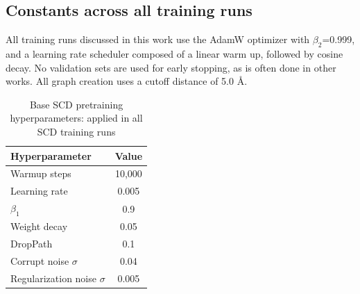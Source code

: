 




\subsection{Constants across all training runs}

All training runs discussed in this work use the AdamW optimizer with $\beta_2$=0.999, and a learning rate scheduler composed of a linear warm up, followed by cosine decay. No validation sets are used for early stopping, as is often done in other works. All graph creation uses a cutoff distance of 5.0 \AA.


\begin{table}[t]
\centering
\caption{Base SCD pretraining hyperparameters: applied in all SCD training runs }
\label{tab:pretrain_hparams}
\begin{tabular}{lc}
\toprule
\textbf{Hyperparameter} & \textbf{Value} \\
\midrule
Warmup steps        & 10{,}000 \\
Learning rate       & 0.005 \\
$\beta_1$           & 0.9 \\
Weight decay        & 0.05 \\
DropPath            & 0.1 \\
Corrupt noise $\sigma$ & 0.04 \\
Regularization noise $\sigma$ & 0.005 \\
\bottomrule
\end{tabular}
\end{table}

